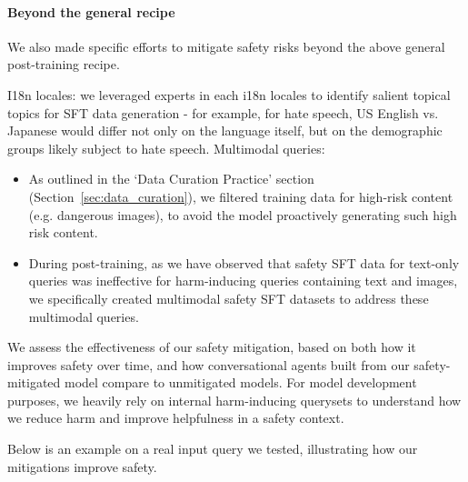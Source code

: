 \paragraph{Beyond the general recipe}

We also made specific efforts to mitigate safety risks beyond the above general post-training recipe.

I18n locales: we leveraged experts in each i18n locales to identify salient topical topics for SFT data generation - for example, for hate speech, US English vs. Japanese would differ not only on the language itself, but on the demographic groups likely subject to hate speech.
\clearpage
Multimodal queries:
\begin{itemize}
\item As outlined in the ‘Data Curation Practice’ section (Section~\ref{sec:data_curation}), we filtered training data for high-risk content (e.g. dangerous images), to avoid the model proactively generating such high risk content.
\item During post-training, as we have observed that safety SFT data for text-only queries was ineffective for harm-inducing queries containing text and images, we specifically created multimodal safety SFT datasets to address these multimodal queries.
\end{itemize}

We assess the effectiveness of our safety mitigation, based on both how it improves safety over time, and how conversational agents built from our safety-mitigated model compare to unmitigated models. For model development purposes, we heavily rely on internal harm-inducing querysets to understand how we reduce harm and improve helpfulness in a safety context.

Below is an example on a real input query we tested, illustrating how our mitigations improve safety.


